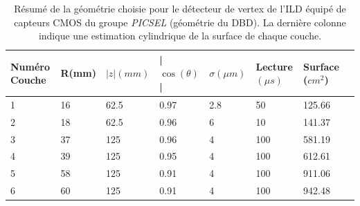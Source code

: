   \begin{table}[h]
   \centering
   \footnotesize
   \begin{tabular}{|l|l|l|l|l|l|l|l|}
   \hline
   Numéro Couche & R(mm) & $|z|(mm)$ & | $\cos(\theta)$| & $\sigma (\mu m)$ & Lecture $(\mu s)$ & Surface ($cm^2$)       \\ \hline
   1             & 16    & 62.5    & 0.97      & 2.8   & 50                    & 125.66  \\ \hline
   2             & 18    & 62.5    & 0.96      & 6     & 10                    & 141.37  \\ \hline
   3             & 37    & 125     & 0.96      & 4     & 100                   & 581.19 \\ \hline
   4             & 39    & 125     & 0.95      & 4     & 100                   & 612.61  \\ \hline
   5             & 58    & 125     & 0.91      & 4     & 100                   & 911.06 \\ \hline
   6             & 60    & 125     & 0.91      & 4     & 100                   & 942.48 \\ \hline
   \end{tabular}
   \caption{R\'esum\'e de la g\'eom\'etrie choisie pour le d\'etecteur de vertex de l'ILD \'equipé de capteurs CMOS du groupe \textit{PICSEL} (g\'eom\'etrie du DBD). La derni\`ere colonne indique une estimation cylindrique de la surface de chaque couche.}
   \label{tab:detecteurVertex}
  \end{table}
  
